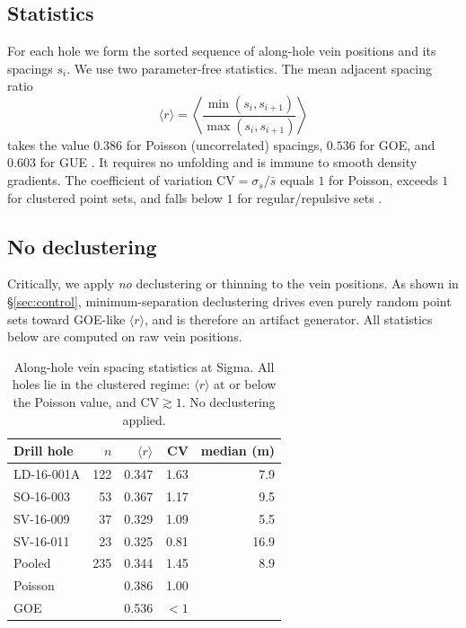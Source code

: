 \documentclass[11pt]{article}
\begin{document}
\subsection{Statistics}
For each hole we form the sorted sequence of along-hole vein positions and its
spacings $s_i$. We use two parameter-free statistics. The mean adjacent
spacing ratio
\begin{equation}
\langle r\rangle = \left\langle
\frac{\min(s_i,s_{i+1})}{\max(s_i,s_{i+1})}\right\rangle
\end{equation}
takes the value $0.386$ for Poisson (uncorrelated) spacings, $0.536$ for GOE,
and $0.603$ for GUE \citep{atas2013}. It requires no unfolding and is immune to
smooth density gradients. The coefficient of variation $\mathrm{CV}=\sigma_s/
\bar{s}$ equals $1$ for Poisson, exceeds $1$ for clustered point sets, and falls
below $1$ for regular/repulsive sets \citep{cox1966}.

\subsection{No declustering}
Critically, we apply \emph{no} declustering or thinning to the vein positions.
As shown in \S\ref{sec:control}, minimum-separation declustering drives even
purely random point sets toward GOE-like $\langle r\rangle$, and is therefore an
artifact generator. All statistics below are computed on raw vein positions.

\begin{table}[t]
\centering
\caption{Along-hole vein spacing statistics at Sigma. All holes lie in the
clustered regime: $\langle r\rangle$ at or below the Poisson value, and
$\mathrm{CV}\gtrsim 1$. No declustering applied.}
\label{tab:holes}
\begin{tabular}{lrrrr}
\toprule
Drill hole & $n$ & $\langle r\rangle$ & CV & median (m) \\
\midrule
LD-16-001A & 122 & 0.347 & 1.63 & 7.9 \\
SO-16-003  & 53  & 0.367 & 1.17 & 9.5 \\
SV-16-009  & 37  & 0.329 & 1.09 & 5.5 \\
SV-16-011  & 23  & 0.325 & 0.81 & 16.9 \\
\midrule
Pooled     & 235 & 0.344 & 1.45 & 8.9 \\
\midrule
Poisson    &     & 0.386 & 1.00 & \\
GOE        &     & 0.536 & $<1$ & \\
\bottomrule
\end{tabular}
\end{table}
\end{document}

